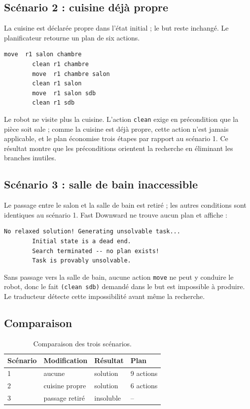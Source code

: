 \documentclass[a4paper, 11pt]{report}
\begin{document}
	\subsection{Scénario 2 : cuisine déjà propre}
	
	La cuisine est déclarée propre dans l'état initial ; le but reste
	inchangé. Le planificateur retourne un plan de six actions.
	
	\begin{lstlisting}[style=pddl, caption={Plan du scénario 2.}]
		move  r1 salon chambre
		clean r1 chambre
		move  r1 chambre salon
		clean r1 salon
		move  r1 salon sdb
		clean r1 sdb
	\end{lstlisting}
	
	Le robot ne visite plus la cuisine. L'action \texttt{clean} exige en
	précondition que la pièce soit sale ; comme la cuisine est déjà propre,
	cette action n'est jamais applicable, et le plan économise trois étapes
	par rapport au scénario 1. Ce résultat montre que les préconditions
	orientent la recherche en éliminant les branches inutiles.
	
	\subsection{Scénario 3 : salle de bain inaccessible}
	
	Le passage entre le salon et la salle de bain est retiré ; les autres
	conditions sont identiques au scénario 1. Fast Downward ne trouve aucun
	plan et affiche :
	
	\begin{lstlisting}[style=base, caption={Sortie de Fast Downward.}]
		No relaxed solution! Generating unsolvable task...
		Initial state is a dead end.
		Search terminated -- no plan exists!
		Task is provably unsolvable.
	\end{lstlisting}
	
	Sans passage vers la salle de bain, aucune action \texttt{move} ne peut y
	conduire le robot, donc le fait \texttt{(clean sdb)} demandé dans le but
	est impossible à produire. Le traducteur détecte cette impossibilité avant
	même la recherche.
	
	\subsection{Comparaison}
	
	\begin{table}[h]
		\centering
		\begin{tabular}{l l l l}
			\hline
			Scénario & Modification & Résultat & Plan \\
			\hline
			1 & aucune & solution & 9 actions \\
			2 & cuisine propre & solution & 6 actions \\
			3 & passage retiré & insoluble & -- \\
			\hline
		\end{tabular}
		\caption{Comparaison des trois scénarios.}
	\end{table}
	
\end{document}
